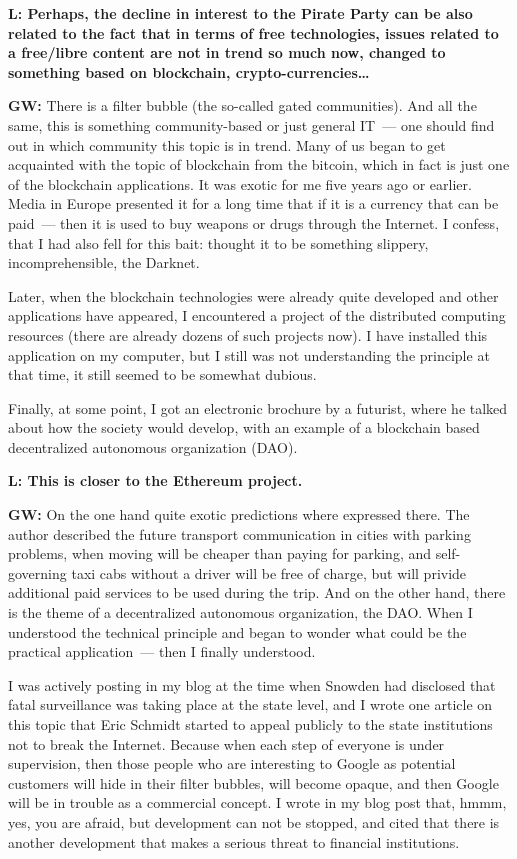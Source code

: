 \documentclass[10pt, a5paper]{article}
\begin{document}
\begin{Parallel}[p]{}{}
{{\noindent \bf L:  Perhaps, the decline in interest to the Pirate Party can be also related to the fact that in terms of free technologies, issues related to a free/libre content are not in trend so much now, changed to something based on blockchain, crypto-currencies\ldots}

{\noindent \bf GW:} There is a filter bubble (the so-called gated communities). And all the same, this is something community-based or just general IT~--- one should find out in which community this topic is in trend. Many of us began to get acquainted with the topic of blockchain from the bitcoin, which in fact is just one of the blockchain applications. It was exotic for me five years ago or earlier. Media in Europe presented it for a long time that if it is a currency that can be paid~--- then it is used to buy weapons or drugs through the Internet. I confess, that I had also fell for this bait: thought it to be something slippery, incomprehensible, the Darknet.

Later, when the blockchain technologies were already quite developed and other applications have appeared, I encountered a project of the distributed computing resources (there are already dozens of such projects now). I have installed this application on my computer, but I still was not understanding the principle at that time, it still seemed to be somewhat dubious.

Finally, at some point, I got an electronic brochure by a futurist, where he talked about how the society would develop, with an example of a blockchain based decentralized autonomous organization (DAO).


{\noindent \bf L: This is closer to the Ethereum project. }

{\noindent \bf GW:} On the one hand quite exotic predictions where expressed there. The author described the future transport communication in cities with parking problems, when moving will be cheaper than paying for parking, and self-governing taxi cabs without a driver will be free of charge, but will privide additional paid services to be used during the trip. And on the other hand, there is the theme of a decentralized autonomous organization, the DAO. When I understood the technical principle and began to wonder what could be the practical application~--- then I finally understood.

I was actively posting in my blog at the time when Snowden had disclosed that fatal surveillance was taking place at the state level, and I wrote one article on this topic that Eric Schmidt started to appeal  publicly to the state institutions not to break the Internet. Because when each step of everyone is under supervision, then those people who are interesting to Google as potential customers will hide in their filter bubbles, will become opaque, and then Google will be in trouble as a commercial concept. I wrote in my blog post that, hmmm, yes, you are afraid, but development can not be stopped, and cited that there is another development that makes a serious threat to financial institutions.

}
\end{Parallel}
\end{document}
